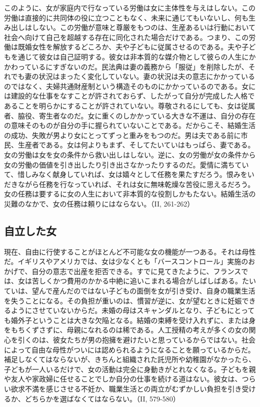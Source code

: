 このように、女が家庭内で行なっている労働は女に主体性を与えはしない。この労働は直接的に共同体の役に立つこともなく、未来に通じてもいないし、何も生み出しはしない。この労働が意味と尊厳をもつのは、生産あるいは行動において社会へ向けて自己を超越する存在に同化された場合だけである。つまり、この労働は既婚女性を解放するどころか、夫や子どもに従属させるのである。夫や子どもを通じて彼女は自己証明する。彼女は非本質的な媒介物として彼らの人生にかかわっているにすぎないのだ。民法典は妻の義務から「服従」を削除したが、それでも妻の状況はまったく変化していない。妻の状況は夫の意志にかかっているのではなく、夫婦共通財産制という構造そのものにかかっているのである。女には建設的な仕事をなすことが許されておらず、したがって自分が完成した人格であることを明らかにすることが許されていない。尊敬されるにしても、女は従属者、脇役、寄生者なのだ。女に重くのしかかっている大きな不運は、自分の存在の意味そのものが自分の手に握られていないことである。だからこそ、結婚生活の成功、失敗が男より女にとってずっと重みをもつのだ。男は夫である前に市民、生産者である。女は何よりもまず、そしてたいていはもっぱら、妻である。女の労働は女を女の条件から救い出しはしない。逆に、女の労働が女の条件から女の労働の価値を引き出したり引き出さなかったりするのだ。愛情に満ちていて、惜しみなく献身していれば、女は嬉々として任務を果たすだろう。恨みをいだきながら任務を行なっていれば、それは女に無味乾燥な苦役に思えるだろう。女の任務は要するに女の人生において非本質的な役割しかもたない。結婚生活の災難のなかで、女の任務は頼りにはならない。（II, 261-262）

\subsection{自立した女}


現在、自由に行使することがほとんど不可能な女の機能が一つある。それは母性だ。イギリスやアメリカでは、女は少なくとも「バースコントロール」実施のおかげで、自分の意志で出産を拒否できる。すでに見てきたように、フランスでは、女は苦しくかつ費用のかかる中絶に追いこまれる場合がしばしばある。たいていは、望んで産んだのではない子どもの面倒を女が引き受け、自身の職業生活を失うことになる。その負担が重いのは、慣習が逆に、女が望むときに妊娠できるようにさせていないからだ。未婚の母はスキャンダルとなり、子どもにとっても婚外子ということは大きな欠陥となる。結婚の束縛を受け入れずに、または身をもちくずさずに、母親になれるのは稀である。人工授精の考えが多くの女の関心を引くのは、彼女たちが男の抱擁を避けたいと思っているからではない。社会によって自由な母性がついには認められるようになることを願っているからだ。補足しなくてはならないが、きちんと組織された託児所や幼稚園がなかったら、子どもが一人いるだけで、女の活動は完全に身動きがとれなくなる。子どもを親や友人や家政婦に任せることでしか自分の仕事を続ける道はない。彼女は、つらい欲求不満を感じさせる不妊か、職業生活との両立がむずかしい負担を引き受けるか、どちらかを選ばなくてはならない。（II, 579-580）

